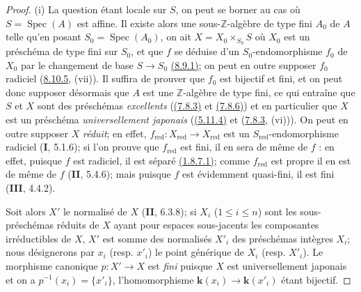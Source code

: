 \begin{proof}
\textup{(i)} La question étant locale sur $S$, on peut se borner au cas
où $S=\operatorname{Spec}(A)$ est affine. Il existe alors une
sous-$\mathbb Z$-algèbre de type fini $A_0$ de $A$ telle qu'en posant
$S_0=\operatorname{Spec}(A_0)$, on ait
$X=X_0\times_{S_0}S$ où $X_0$ est un préschéma de type fini sur $S_0$,
et que $f$ se déduise d'un $S_0$-endomorphisme $f_0$ de $X_0$ par le
changement de base $S\to S_0$
{\hyperref[canon-index.ega4.c04.prop.8-9-1]{(8.9.1)}}; on peut en outre supposer
$f_0$ radiciel ({\hyperref[canon-index.ega4.c04.thm.8-10-5]{8.10.5}}, (vii)). Il
suffira de prouver que $f_0$ est bijectif et fini, et on peut donc
supposer désormais que $A$ est une $\mathbb Z$-algèbre de type fini, ce
qui entraîne que $S$ et $X$ sont des préschémas \emph{excellents}
({\hyperref[canon-index.ega4.c04.statement.7-8-3]{(7.8.3)}} et
{\hyperref[canon-index.ega4.c04.prop.7-8-6]{(7.8.6)}}) et en particulier que $X$
est un préschéma \emph{universellement japonais}
({\hyperref[canon-index.ega4.c04.cor.5-11-4]{(5.11.4)}} et
({\hyperref[canon-index.ega4.c04.statement.7-8-3]{7.8.3}}, (vi))). On peut en outre
supposer $X$ \emph{réduit}; en effet,
$f_{\mathrm{red}}:X_{\mathrm{red}}\to X_{\mathrm{red}}$ est un
$S_{\mathrm{red}}$-endomorphisme radiciel (\textbf{I}, 5.1.6); si l'on prouve que
$f_{\mathrm{red}}$ est fini, il en sera de même de $f$ : en effet,
puisque $f$ est radiciel, il est séparé
{\hyperref[canon-index.ega4.c04.lem.1-8-7-1]{(1.8.7.1)}}; comme
$f_{\mathrm{red}}$ est propre il en est de même de $f$ (\textbf{II}, 5.4.6);
mais puisque $f$ est évidemment quasi-fini, il est fini (\textbf{III}, 4.4.2).

Soit alors $X'$ le normalisé de $X$ (\textbf{II}, 6.3.8); si $X_i$
($1\leq i\leq n$) sont les sous-préschémas réduits de $X$ ayant pour
espaces sous-jacents les composantes irréductibles de $X$, $X'$ est
somme des normalisés $X'_i$ des préschémas intègres $X_i$; nous
désignerons par $x_i$ (resp. $x'_i$) le point générique de $X_i$
(resp. $X'_i$). Le morphisme canonique $p:X'\to X$ est \emph{fini} puisque
$X$ est universellement japonais et on a
$p^{-1}(x_i)=\{x'_i\}$, l'homomorphisme $\boldsymbol{k}(x_i)\to\boldsymbol{k}(x'_i)$ étant
bijectif.


\end{proof}
